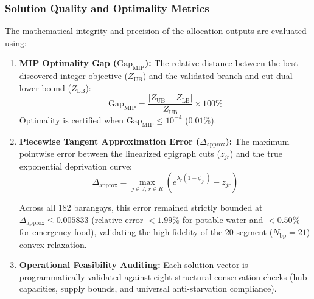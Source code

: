 \subsubsection{Solution Quality and Optimality Metrics}
The mathematical integrity and precision of the allocation outputs are evaluated using:
\begin{enumerate}
    \item \textbf{MIP Optimality Gap ($\text{Gap}_{\text{MIP}}$):} The relative distance between the best discovered integer objective ($Z_{\text{UB}}$) and the validated branch-and-cut dual lower bound ($Z_{\text{LB}}$):
    \begin{equation}
        \text{Gap}_{\text{MIP}} = \frac{|Z_{\text{UB}} - Z_{\text{LB}}|}{Z_{\text{UB}}} \times 100\%
    \end{equation}
    Optimality is certified when $\text{Gap}_{\text{MIP}} \le 10^{-4}$ ($0.01\%$).
    
    \item \textbf{Piecewise Tangent Approximation Error ($\Delta_{\text{approx}}$):} 
    The maximum pointwise error between the linearized epigraph cuts ($z_{jr}$) and the true exponential deprivation curve:
    \begin{equation}
        \Delta_{\text{approx}} = \max_{j \in J, \, r \in R} \left( e^{\lambda_r(1 - \phi_{jr})} - z_{jr} \right)
    \end{equation}
    
    Across all 182 barangays, this error remained strictly bounded at $\Delta_{\text{approx}} \le 0.005833$ (relative error $< 1.99\%$ for potable water and $< 0.50\%$ for emergency food), validating the high fidelity of the 20-segment ($N_{\text{bp}} = 21$) convex relaxation.

    
    \item \textbf{Operational Feasibility Auditing:} Each solution vector is programmatically validated against eight structural conservation checks (hub capacities, supply bounds, and universal anti-starvation compliance).
\end{enumerate}

